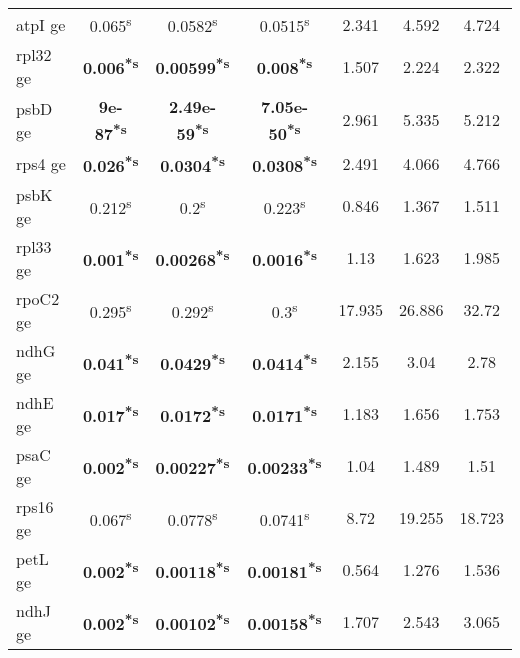 \documentclass[a4paper]{article}
\begin{document}
\begin{longtable}{l|c|c|c|c|c|c}
atpI ge&0.065\textsuperscript{s}&0.0582\textsuperscript{s}&0.0515\textsuperscript{s}&2.341&4.592&4.724\\
rpl32 ge&\textbf{0.006\textsuperscript{*}\textsuperscript{s}}&\textbf{0.00599\textsuperscript{*}\textsuperscript{s}}&\textbf{0.008\textsuperscript{*}\textsuperscript{s}}&1.507&2.224&2.322\\
psbD ge&\textbf{9e-87\textsuperscript{*}\textsuperscript{s}}&\textbf{2.49e-59\textsuperscript{*}\textsuperscript{s}}&\textbf{7.05e-50\textsuperscript{*}\textsuperscript{s}}&2.961&5.335&5.212\\
rps4 ge&\textbf{0.026\textsuperscript{*}\textsuperscript{s}}&\textbf{0.0304\textsuperscript{*}\textsuperscript{s}}&\textbf{0.0308\textsuperscript{*}\textsuperscript{s}}&2.491&4.066&4.766\\
psbK ge&0.212\textsuperscript{s}&0.2\textsuperscript{s}&0.223\textsuperscript{s}&0.846&1.367&1.511\\
rpl33 ge&\textbf{0.001\textsuperscript{*}\textsuperscript{s}}&\textbf{0.00268\textsuperscript{*}\textsuperscript{s}}&\textbf{0.0016\textsuperscript{*}\textsuperscript{s}}&1.13&1.623&1.985\\
rpoC2 ge&0.295\textsuperscript{s}&0.292\textsuperscript{s}&0.3\textsuperscript{s}&17.935&26.886&32.72\\
ndhG ge&\textbf{0.041\textsuperscript{*}\textsuperscript{s}}&\textbf{0.0429\textsuperscript{*}\textsuperscript{s}}&\textbf{0.0414\textsuperscript{*}\textsuperscript{s}}&2.155&3.04&2.78\\
ndhE ge&\textbf{0.017\textsuperscript{*}\textsuperscript{s}}&\textbf{0.0172\textsuperscript{*}\textsuperscript{s}}&\textbf{0.0171\textsuperscript{*}\textsuperscript{s}}&1.183&1.656&1.753\\
psaC ge&\textbf{0.002\textsuperscript{*}\textsuperscript{s}}&\textbf{0.00227\textsuperscript{*}\textsuperscript{s}}&\textbf{0.00233\textsuperscript{*}\textsuperscript{s}}&1.04&1.489&1.51\\
rps16 ge&0.067\textsuperscript{s}&0.0778\textsuperscript{s}&0.0741\textsuperscript{s}&8.72&19.255&18.723\\
petL ge&\textbf{0.002\textsuperscript{*}\textsuperscript{s}}&\textbf{0.00118\textsuperscript{*}\textsuperscript{s}}&\textbf{0.00181\textsuperscript{*}\textsuperscript{s}}&0.564&1.276&1.536\\
ndhJ ge&\textbf{0.002\textsuperscript{*}\textsuperscript{s}}&\textbf{0.00102\textsuperscript{*}\textsuperscript{s}}&\textbf{0.00158\textsuperscript{*}\textsuperscript{s}}&1.707&2.543&3.065\\

\end{longtable}
\end{document}

